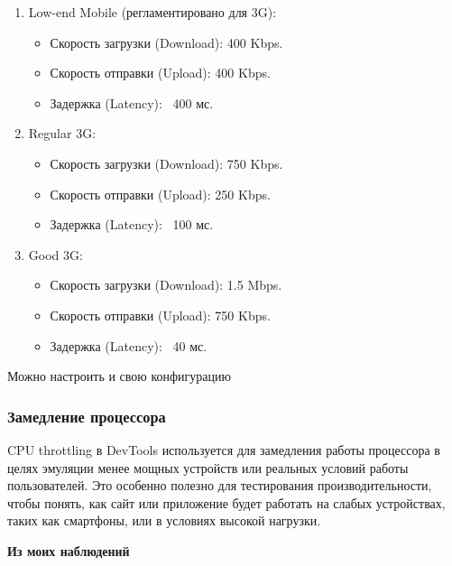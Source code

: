 \documentclass[12pt]{article}
\begin{document}
\begin{enumerate}
    \item Low-end Mobile (регламентировано для 3G):

          \begin{itemize}[label=-]
              \item Скорость загрузки (Download): 400 Kbps.
              \item Скорость отправки (Upload): 400 Kbps.
              \item Задержка (Latency): ~400 мс.

          \end{itemize}
    \item Regular 3G:

          \begin{itemize}[label=-]
              \item Скорость загрузки (Download): 750 Kbps.
              \item Скорость отправки (Upload): 250 Kbps.
              \item Задержка (Latency): ~100 мс.

          \end{itemize}

    \item Good 3G:
          \begin{itemize}[label=-]
              \item Скорость загрузки (Download): 1.5 Mbps.
              \item Скорость отправки (Upload): 750 Kbps.
              \item Задержка (Latency): ~40 мс.
          \end{itemize}
\end{enumerate}

Можно настроить и свою конфигурацию

\subsubsection{Замедление процессора}

CPU throttling в DevTools используется для замедления работы процессора
в целях эмуляции менее мощных устройств или реальных условий работы пользователей.
Это особенно полезно для тестирования производительности, чтобы понять,
как сайт или приложение будет работать на слабых устройствах,
таких как смартфоны, или в условиях высокой нагрузки.

\textbf{Из моих наблюдений}
\end{document}
